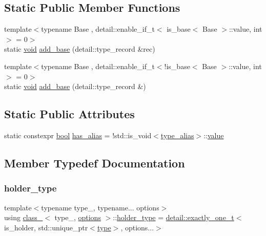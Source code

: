 \subsection*{Static Public Member Functions}
\begin{DoxyCompactItemize}
\item 
{\footnotesize template$<$typename Base , detail\+::enable\+\_\+if\+\_\+t$<$ is\+\_\+base$<$ Base $>$\+::value, int $>$  = 0$>$ }\\static \mbox{\hyperlink{_s_d_l__opengles2__gl2ext_8h_ae5d8fa23ad07c48bb609509eae494c95}{void}} \mbox{\hyperlink{classclass___a118815a833b1fe76c91536afdfc1f305}{add\+\_\+base}} (detail\+::type\+\_\+record \&rec)
\item 
{\footnotesize template$<$typename Base , detail\+::enable\+\_\+if\+\_\+t$<$!is\+\_\+base$<$ Base $>$\+::value, int $>$  = 0$>$ }\\static \mbox{\hyperlink{_s_d_l__opengles2__gl2ext_8h_ae5d8fa23ad07c48bb609509eae494c95}{void}} \mbox{\hyperlink{classclass___a3e06e8a15ef89f19a08a9ca0bf8277de}{add\+\_\+base}} (detail\+::type\+\_\+record \&)
\end{DoxyCompactItemize}
\subsection*{Static Public Attributes}
\begin{DoxyCompactItemize}
\item 
static constexpr \mbox{\hyperlink{asdl_8h_af6a258d8f3ee5206d682d799316314b1}{bool}} \mbox{\hyperlink{classclass___ad98ce9926c534c9e8859a144f50d2b59}{has\+\_\+alias}} = !std\+::is\+\_\+void$<$\mbox{\hyperlink{classclass___a18716f57a4db37eb2e5482309e5253c4}{type\+\_\+alias}}$>$\+::\mbox{\hyperlink{_s_d_l__opengl__glext_8h_a8ad81492d410ff2ac11f754f4042150f}{value}}
\end{DoxyCompactItemize}


\subsection{Member Typedef Documentation}
\mbox{\label{classclass___ad22258342739bda577366b3a13a98796}} 
\subsubsection{\texorpdfstring{holder\_type}{holder\_type}}
{\footnotesize\ttfamily template$<$typename type\+\_\+, typename... options$>$ \\
using \mbox{\hyperlink{classclass__}{class\+\_\+}}$<$ type\+\_\+, \mbox{\hyperlink{classoptions}{options}} $>$\+::\mbox{\hyperlink{classclass___ad22258342739bda577366b3a13a98796}{holder\+\_\+type}} =  \mbox{\hyperlink{detail_2common_8h_a9ec2c72f4073efb0fb0bd007b0616f0a}{detail\+::exactly\+\_\+one\+\_\+t}}$<$is\+\_\+holder, std\+::unique\+\_\+ptr$<$\mbox{\hyperlink{classclass___a90e08a4ecffb596c1f1055f47747ad91}{type}}$>$, options...$>$}


